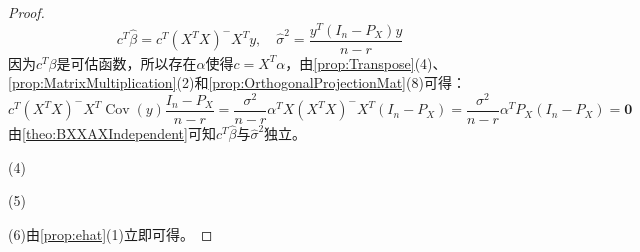 \begin{proof}
\begin{equation*}
		c^T\hat{\beta}=c^T(X^TX)^-X^Ty,\quad\hat{\sigma}^2=\frac{y^T(I_n-P_X)y}{n-r}
	\end{equation*}
	因为$c^T\beta$是可估函数，所以存在$\alpha$使得$c=X^T\alpha$，由\cref{prop:Transpose}(4)、\cref{prop:MatrixMultiplication}(2)和\cref{prop:OrthogonalProjectionMat}(8)可得：
	\begin{equation*}
		c^T(X^TX)^-X^T\operatorname{Cov}(y)\frac{I_n-P_X}{n-r}=\frac{\sigma^2}{n-r}\alpha^TX(X^TX)^-X^T(I_n-P_X)=\frac{\sigma^2}{n-r}\alpha^TP_X(I_n-P_X)=\mathbf{0}
	\end{equation*}
	由\cref{theo:BXXAXIndependent}可知$c^T\hat{\beta}$与$\hat{\sigma}^2$独立。\par
	(4)\par
	(5)\par
	(6)由\cref{prop:ehat}(1)立即可得。
\end{proof}

